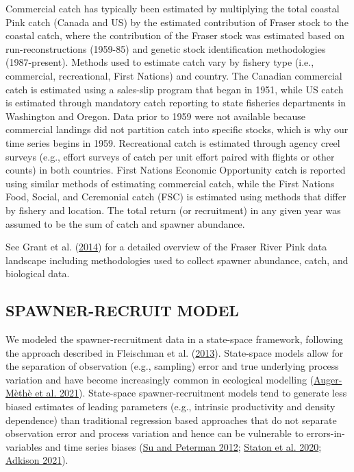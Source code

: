 \documentclass[11pt]{book}
\begin{document}
Commercial catch has typically been estimated by multiplying the total coastal Pink catch (Canada and US) by the estimated contribution of Fraser stock to the coastal catch, where the contribution of the Fraser stock was estimated based on run-reconstructions (1959-85) and genetic stock identification methodologies (1987-present). Methods used to estimate catch vary by fishery type (i.e., commercial, recreational, First Nations) and country. The Canadian commercial catch is estimated using a sales-slip program that began in 1951, while US catch is estimated through mandatory catch reporting to state fisheries departments in Washington and Oregon. Data prior to 1959 were not available because commercial landings did not partition catch into specific stocks, which is why our time series begins in 1959. Recreational catch is estimated through agency creel surveys (e.g., effort surveys of catch per unit effort paired with flights or other counts) in both countries. First Nations Economic Opportunity catch is reported using similar methods of estimating commercial catch, while the First Nations Food, Social, and Ceremonial catch (FSC) is estimated using methods that differ by fishery and location. The total return (or recruitment) in any given year was assumed to be the sum of catch and spawner abundance.

See Grant et al. (\protect\hyperlink{ref-grantFraserRiverPink2014}{2014}) for a detailed overview of the Fraser River Pink data landscape including methodologies used to collect spawner abundance, catch, and biological data.

\hypertarget{spawner-recruit-model}{%
\subsection{SPAWNER-RECRUIT MODEL}\label{spawner-recruit-model}}

We modeled the spawner-recruitment data in a state-space framework, following the approach described in Fleischman et al. (\protect\hyperlink{ref-fleischmanAgestructuredStatespaceStock2013}{2013}). State-space models allow for the separation of observation (e.g., sampling) error and true underlying process variation and have become increasingly common in ecological modelling (\protect\hyperlink{ref-auger-metheGuideStateSpace2021}{Auger-Mèthè et al. 2021}). State-space spawner-recruitment models tend to generate less biased estimates of leading parameters (e.g., intrinsic productivity and density dependence) than traditional regression based approaches that do not separate observation error and process variation and hence can be vulnerable to errors-in-variables and time series biases (\protect\hyperlink{ref-suPerformanceBayesianStatespace2012}{Su and Peterman 2012}; \protect\hyperlink{ref-statonEvaluationMethodsSpawner2020}{Staton et al. 2020}; \protect\hyperlink{ref-adkisonReviewSalmonSpawnerRecruitment2021}{Adkison 2021}).
\end{document}
